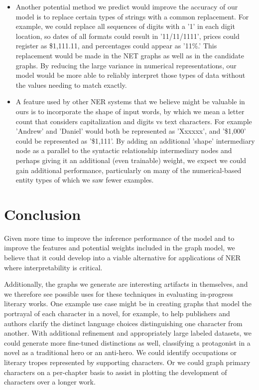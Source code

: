 \documentclass[11pt,a4paper]{article}
\begin{document}
\begin{itemize}
\item Another potential method we predict would improve the accuracy of our model is to replace certain types of strings with a common replacement. For example, we could replace all sequences of digits with a '1' in each digit location, so dates of all formats could result in '11/11/1111', prices could register as \$1,111.11, and percentages could appear as '11\%.' This replacement would be made in the NET graphs as well as in the candidate graphs. By reducing the large variance in numerical representations, our model would be more able to reliably interpret those types of data without the values needing to match exactly.

\item A feature used by other NER systems that we believe might be valuable in ours is to incorporate the shape of input words, by which we mean a letter count that considers capitalization and digits vs text characters. For example 'Andrew' and 'Daniel' would both be represented as 'Xxxxxx', and '\$1,000' could be represented as '\$1,111'. By adding an additional 'shape' intermediary node as a parallel to the syntactic relationship intermediary nodes and perhaps giving it an additional (even trainable) weight, we expect we could gain additional performance, particularly on many of the numerical-based entity types of which we saw fewer examples.

\end{itemize}

\section{Conclusion}

Given more time to improve the inference performance of the model and to improve the features and potential weights included in the graph model, we believe that it could develop into a viable alternative for applications of NER where interpretability is critical.

Additionally, the graphs we generate are interesting artifacts in themselves, and we therefore see possible uses for these techniques in evaluating in-progress literary works. One example use case might be in creating graphs that model the portrayal of each character in a novel, for example, to help publishers and authors clarify the distinct language choices distinguishing one character from another. With additional refinement and appropriately large labeled datasets, we could generate more fine-tuned distinctions as well, classifying a protagonist in a novel as a traditional hero or an anti-hero. We could identify occupations or literary tropes represented by supporting characters. Or we could graph primary characters on a per-chapter basis to assist in plotting the development of characters over a longer work.
\end{document}
